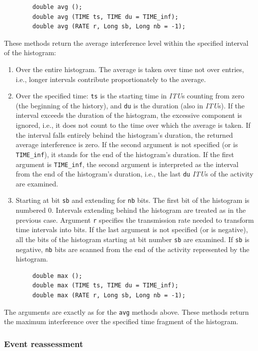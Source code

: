 \begin{verbatim}
        double avg ();
        double avg (TIME ts, TIME du = TIME_inf);
        double avg (RATE r, Long sb, Long nb = -1);
\end{verbatim}
\noindent
These methods return the average interference level within the specified
interval of the histogram:
\begin{enumerate}
\item
Over the entire histogram. 
The average is taken over time not over entries, i.e., longer intervals
contribute proportionately to the average.
\item
Over the specified time: {\tt ts} is the starting time in {\em ITU\/}s counting
from zero (the beginning of the history), and {\tt du} is the duration (also
in {\em ITU\/}s).
If the interval exceeds the duration of the histogram, the excessive
component is ignored, i.e., it does not count to the time over which the
average is taken.
If the interval falls entirely behind the histogram's duration, the returned
average interference is zero.
If the second argument is not specified (or is {\tt TIME\_inf}), it stands for
the end of the histogram's duration.
If the first argument is {\tt TIME\_inf}, the second argument is interpreted
as the interval from the end of the histogram's duration, i.e., the last
{\tt du} {\em ITU\/}s of the activity are examined.
\item
Starting at bit {\tt sb} and extending for {\tt nb} bits.
The first bit of the histogram is numbered 0.
Intervals extending behind the histogram are treated as in the previous case.
Argument {\tt r} specifies the transmission rate needed to transform
time intervals into bits.
If the last argument is not specified (or is negative), all the bits of the
histogram starting at bit number {\tt sb} are examined.
If {\tt sb} is negative, {\tt nb} bits are scanned from the end of the
activity represented by the histogram.
\end{enumerate}

\begin{verbatim}
        double max ();
        double max (TIME ts, TIME du = TIME_inf);
        double max (RATE r, Long sb, Long nb = -1);
\end{verbatim}
\noindent
The arguments are exactly as for the {\tt avg} methods above.
These methods return the maximum interference over the specified time fragment
of the histogram.

\subsubsection{Event reassessment}
\label{rm_po_wr_re}

